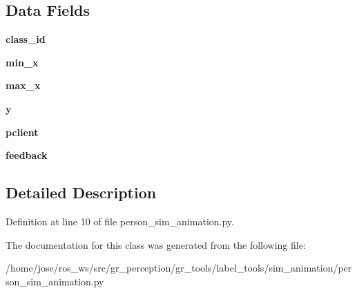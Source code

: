 \subsection*{Data Fields}
\begin{DoxyCompactItemize}
\item 
\mbox{\label{classsim__animation_1_1person__sim__animation_1_1PersonSimAnimation_ac42028277d252233aba528cb385b91ef}} 
{\bfseries class\+\_\+id}
\item 
\mbox{\label{classsim__animation_1_1person__sim__animation_1_1PersonSimAnimation_aa1bd0d6f7592efbb8c1c91d702a3ce42}} 
{\bfseries min\+\_\+x}
\item 
\mbox{\label{classsim__animation_1_1person__sim__animation_1_1PersonSimAnimation_adafaab969b6d14845cd18b42ce908be9}} 
{\bfseries max\+\_\+x}
\item 
\mbox{\label{classsim__animation_1_1person__sim__animation_1_1PersonSimAnimation_a2cdfd831078b23e24fcc5f166e0b8ff7}} 
{\bfseries y}
\item 
\mbox{\label{classsim__animation_1_1person__sim__animation_1_1PersonSimAnimation_a46a60a9a382cd1e87b1e6db990738c40}} 
{\bfseries pclient}
\item 
\mbox{\label{classsim__animation_1_1person__sim__animation_1_1PersonSimAnimation_aae3ff7da8daa1594b1e6bdb842a7fd92}} 
{\bfseries feedback}
\end{DoxyCompactItemize}


\subsection{Detailed Description}


Definition at line 10 of file person\+\_\+sim\+\_\+animation.\+py.



The documentation for this class was generated from the following file\+:\begin{DoxyCompactItemize}
\item 
/home/jose/ros\+\_\+ws/src/gr\+\_\+perception/gr\+\_\+tools/label\+\_\+tools/sim\+\_\+animation/person\+\_\+sim\+\_\+animation.\+py\end{DoxyCompactItemize}
